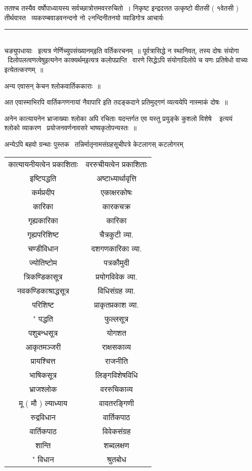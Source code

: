 \documentclass[11pt, openany]{book}
\begin{document}
\begin{multicols}{2}
ततश्च तस्यैव वर्षोपाध्यायस्य सर्वच्छात्रोत्तमवररुचितो~। निकृष्ट इन्द्रदत्तत उत्कृष्टो वीतसी ( १वेतसी ) तीर्थवास्त \textendash\ व्यकरम्बवाडवनन्दनो नो २नन्दिनीतनयो व्याडिगोत्र आचार्यः

\noindent
\rule{1\linewidth}{0.5pt}\\

\noindent
चङ्युपधायाः \textendash\ इत्यत्र {\qt णेर्णिच्युपसंख्यानम्}इति वर्तिकरचनम्~॥ {\qt पूर्वत्रासिद्धे न स्थानिवत्, तस्य दोषः संयोगा \textendash\ दिलोपलत्वणत्वेषु}इत्यनेन काक्यर्थम्{\qt इत्यत्र कलोपप्राप्ति \textendash\ वारणे सिद्धेऽपि संयोगादिलोपे च यणः प्रतिषेधो वाच्यः} इत्येतत्करणम्~॥

अन्य एवासन् केचन श्लोकवार्तिककाराः~॥

अत एवास्माभिरपि वार्तिकगणनायां नैवापारि इति तदङ्कदाने प्रतिमुद्गणं व्यत्ययेपि नास्माकं दोषः~॥

अनेन कात्यायनेन भ्राजाख्याः श्लोका अपि रचिताः यदन्तर्गत एव {\qt यस्तु प्रयुङ्के कुशलो विशेषे \textendash\ } इत्ययं श्लोको व्याकरण \textendash\ प्रयोजनवर्णनावसरे भाष्यकृतोपन्यस्तः~॥

अन्येऽपि बहवो ग्रन्थाः पुस्तक \textendash\ तन्निर्मातृनामसंग्रहसूचीपत्रे केटलागस् कटलोगरम् 

\begin{tabular}{c c}
कात्यायनीयत्वेन प्रकाशिताः & वररुचीयत्वेन प्रकाशिताः\\
इष्टिपद्धति & अष्टाध्यार्थावृत्ति \\
कर्मप्रदीप & एकाक्षरकोषः \\
कारिका & कारकचक्र \\
गृह्यकारिका & कारिका \\
गृह्यपरिशिष्ट & चैत्रकुटी व्या. \\
चण्डीविधान & दशगणकारिका व्या. \\
ज्योतिष्टोम & पत्रकौमुदी \\
त्रिकण्डिकासूत्र & प्रयोगविवेक व्या. \\
नवकण्डिकाश्राद्धसूत्र & विधिसंग्रह व्या. \\
परिशिष्ट & प्राकृतप्रकाश व्या. \\
" पद्धति & फुल्लसूत्र \\
पशुबन्धसूत्र & योगशत \\
आकृतमञ्जरी & राक्षसकाव्य \\
प्रायश्चित्त & राजनीति \\
भाषिकसूत्र & लिङ्गविशेषविधि \\
भ्राजश्लोक & वररुचिकाव्य \\
मू ( मौ ) ल्याध्याय & वादतरङ्गिणी \\
रुद्रविधान & वार्तिकपाठ \\
वार्तिकपाठ & विवेकसंग्रह \\
शान्ति & शब्दलक्षण \\
" विधान & श्रुतबोध 
\end{tabular}


\end{multicols}
\end{document}
